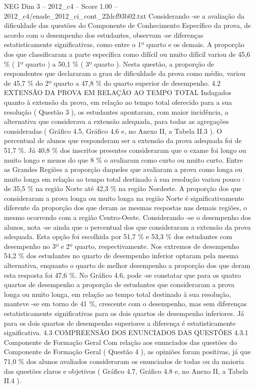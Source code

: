 \begin{textsample}{NEG Dim 3 – 2012\_c4 – Score 1.00 – 2012\_c4/enade\_2012\_ci\_cont\_22dcf93b02.txt}
Considerando -se a avaliação da dificuldade das questões do Componente de Conhecimento Específico da prova, de acordo com o desempenho dos estudantes, observam -se diferenças estatisticamente significativas, como entre o 1º quarto e os demais.
A proporção dos que classificaram a parte específica como difícil ou muito difícil variou de 45,6 \% ( 1º quarto ) a 50,1 \% ( 3º quarto ).
Nesta questão, a proporção de respondentes que declararam o grau de dificuldade da prova como médio, variou de 45,7 \% do 2º quarto a 47,8 \% do quarto superior de desempenho. 4.2 EXTENSÃO DA PROVA EM RELAÇÃO AO TEMPO TOTAL Indagados quanto à extensão da prova, em relação ao tempo total oferecido para a sua resolução ( Questão 3 ), os estudantes apontaram, com maior incidência, a alternativa que considerava a extensão adequada, para todas as agregações consideradas ( Gráfico 4.5, Gráfico 4.6 e, no Anexo II, a Tabela II.3 ).
O percentual de alunos que responderam ser a extensão da prova adequada foi de 51,7 \%.
Já 40,8 \% dos inscritos presentes consideraram que o exame foi longo ou muito longo e menos do que 8 \% o avaliaram como curto ou muito curto.
Entre as Grandes Regiões a proporção daqueles que avaliaram a prova como longa ou muito longa em relação ao tempo total destinado à sua resolução variou pouco : de 35,5 \% na região Norte até 42,3 \% na região Nordeste.
A proporção dos que consideraram a prova longa ou muito longa na região Norte é significativamente diferente da proporção dos que deram as mesmas respostas nas demais regiões, o mesmo ocorrendo com a região Centro-Oeste.
Considerando -se o desempenho dos alunos, nota -se ainda que o percentual dos que consideraram a extensão da prova adequada.
Esta opção foi escolhida por 51,7 \% e 53,3 \% dos estudantes com desempenho no 3º e 2º quarto, respectivamente.
Nos extremos de desempenho 54,2 \% dos estudantes no quarto de desempenho inferior optaram pela mesma alternativa, enquanto o quarto de melhor desempenho a proporção dos que deram esta resposta foi 47,6 \%.
No Gráfico 4.6, pode -se constatar que para os quatro quartos de desempenho a proporção de estudantes que consideraram a prova longa ou muito longa, em relação ao tempo total destinado à sua resolução, manteve -se em torno de 41 \%, crescente com o desempenho, mas sem diferenças estatisticamente significativas para os dois quartos de desempenho inferiores.
Já para os dois quartos de desempenho superiores a diferença é estatisticamente significativa. 4.3 COMPREENSÃO DOS ENUNCIADOS DAS QUESTÕES 4.3.1 Componente de Formação Geral Com relação aos enunciados das questões do Componente de Formação Geral ( Questão 4 ), as opiniões foram positivas, já que 71,0 \% dos alunos avaliados consideraram os enunciados de todas ou da maioria das questões claros e objetivos ( Gráfico 4.7, Gráfico 4.8 e, no Anexo II, a Tabela II.4 ).

\end{textsample}
